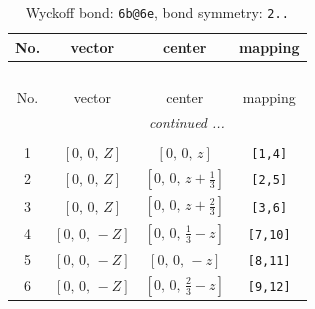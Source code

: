 \documentclass[fleqn,8pt]{jsarticle}
\begin{document}
\begin{longtable}{cccc}
\caption{Wyckoff bond: {\tt 6b@6e}, bond symmetry: {\tt 2..}}
 \\
 \hline \hline
No. & vector & center & mapping \\ \hline \endfirsthead

\multicolumn{3}{l}{\tablename\ \thetable{}} \\
 \hline \hline
No. & vector & center & mapping \\ \hline \endhead

 \hline \hline
\multicolumn{3}{r}{\footnotesize\it continued ...} \\ \endfoot

 \hline \hline
\multicolumn{3}{r}{} \\ \endlastfoot

1 & $\left[ 0,\, 0,\, Z \right]$ & $\left[ 0,\, 0,\, z \right]$ & {\tt [1,4]} \\ \hline
2 & $\left[ 0,\, 0,\, Z \right]$ & $\left[ 0,\, 0,\, z + \frac{1}{3} \right]$ & {\tt [2,5]} \\ \hline
3 & $\left[ 0,\, 0,\, Z \right]$ & $\left[ 0,\, 0,\, z + \frac{2}{3} \right]$ & {\tt [3,6]} \\ \hline
4 & $\left[ 0,\, 0,\, - Z \right]$ & $\left[ 0,\, 0,\, \frac{1}{3} - z \right]$ & {\tt [7,10]} \\ \hline
5 & $\left[ 0,\, 0,\, - Z \right]$ & $\left[ 0,\, 0,\, - z \right]$ & {\tt [8,11]} \\ \hline
6 & $\left[ 0,\, 0,\, - Z \right]$ & $\left[ 0,\, 0,\, \frac{2}{3} - z \right]$ & {\tt [9,12]} \\
\end{longtable}
\renewcommand{\arraystretch}{1.2}
\end{document}
